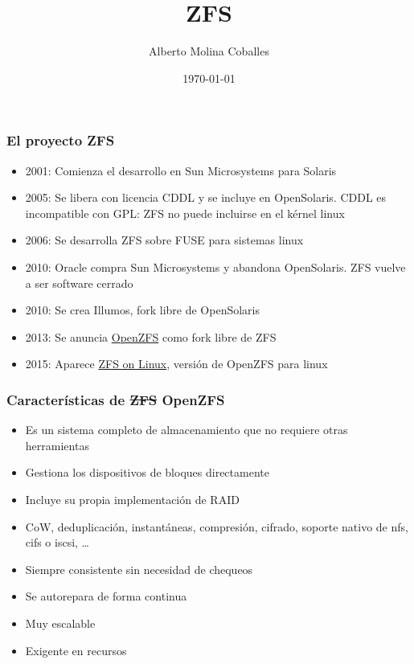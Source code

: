 \documentclass[aspectratio=169]{beamer}
\author{Alberto Molina Coballes}
\title{ZFS}
\institute{IES Gonzalo Nazareno}
\date{\today}
\begin{document}
\def\braces#1{[#1]}

\begin{frame}[t,plain]
\titlepage
\end{frame}

\begin{frame}
  \frametitle{El proyecto ZFS}
  \begin{itemize}
  \item 2001: Comienza el desarrollo en Sun Microsystems para Solaris
  \item 2005: Se libera con licencia CDDL y se incluye en
    OpenSolaris. CDDL es incompatible con GPL: ZFS no puede incluirse
    en el kérnel linux
  \item 2006: Se desarrolla ZFS sobre FUSE para sistemas linux
  \item 2010: Oracle compra Sun Microsystems y abandona
    OpenSolaris. ZFS vuelve a ser software cerrado
  \item 2010: Se crea Illumos, fork libre de OpenSolaris
  \item 2013: Se anuncia
    \href{http://open-zfs.org/wiki/Main_Page}{OpenZFS} como fork libre
    de ZFS
  \item 2015: Aparece \href{https://zfsonlinux.org/}{ZFS on Linux},
    versión de OpenZFS para linux
  \end{itemize}
\end{frame}

\begin{frame}
  \frametitle{Características de \sout{ZFS} OpenZFS}
  \begin{itemize}
  \item Es un sistema completo de almacenamiento que no requiere
    otras herramientas
  \item Gestiona los dispositivos de bloques directamente
  \item Incluye su propia implementación de RAID
  \item CoW, deduplicación, instantáneas, compresión, cifrado, soporte
    nativo de nfs, cifs o iscsi, \ldots
  \item Siempre consistente sin necesidad de chequeos
  \item Se autorepara de forma continua
  \item Muy escalable
  \item Exigente en recursos
  \end{itemize}
\end{frame}
\end{document}
